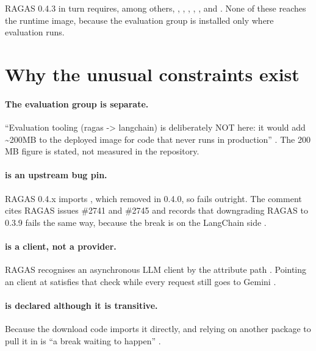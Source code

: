 RAGAS 0.4.3 in turn requires, among others, , , , , ,  and  \tagM. None of these reaches the runtime image, because the evaluation group is installed only where evaluation runs.

\section{Why the unusual constraints exist}

\paragraph{The evaluation group is separate.} \enquote{Evaluation tooling (ragas -> langchain) is deliberately NOT here: it would add \textasciitilde200MB to the deployed image for code that never runs in production} . The 200\,MB figure is stated, not measured in the repository.

\paragraph{ is an upstream bug pin.} RAGAS 0.4.x imports , which  removed in 0.4.0, so  fails outright. The comment cites RAGAS issues \#2741 and \#2745 and records that downgrading RAGAS to 0.3.9 fails the same way, because the break is on the LangChain side .

\paragraph{ is a client, not a provider.} RAGAS recognises an asynchronous LLM client by the attribute path . Pointing an  client at  satisfies that check while every request still goes to Gemini .

\paragraph{ is declared although it is transitive.} Because the download code imports it directly, and relying on another package to pull it in is \enquote{a break waiting to happen} .

